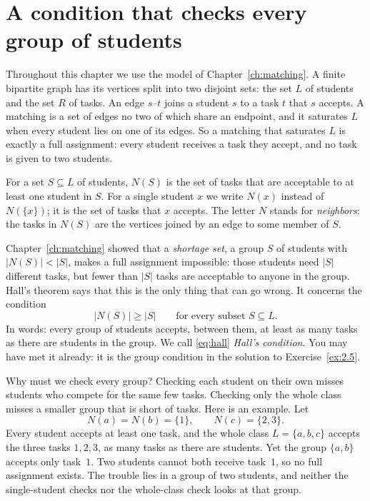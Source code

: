 \section{A condition that checks every group of students}\label{ch09:sec:condition}
Throughout this chapter we use the model of Chapter~\ref{ch:matching}. A finite bipartite graph has its vertices split into two disjoint sets: the set $L$ of students and the set $R$ of tasks. An edge $s$--$t$ joins a student $s$ to a task $t$ that $s$ accepts. A matching is a set of edges no two of which share an endpoint, and it saturates $L$ when every student lies on one of its edges. So a matching that saturates $L$ is exactly a full assignment: every student receives a task they accept, and no task is given to two students.

For a set $S\subseteq L$ of students, $N(S)$ is the set of tasks that are acceptable to at least one student in $S$. For a single student $x$ we write $N(x)$ instead of $N(\{x\})$; it is the set of tasks that $x$ accepts. The letter $N$ stands for \emph{neighbors}: the tasks in $N(S)$ are the vertices joined by an edge to some member of $S$.

Chapter~\ref{ch:matching} showed that a \emph{shortage set}, a group $S$ of students with $|N(S)|<|S|$, makes a full assignment impossible: those students need $|S|$ different tasks, but fewer than $|S|$ tasks are acceptable to anyone in the group. Hall's theorem says that this is the only thing that can go wrong. It concerns the condition
\[
|N(S)|\ge |S|\qquad\text{for every subset }S\subseteq L.
\tag{H}\label{eq:hall}
\]
In words: every group of students accepts, between them, at least as many tasks as there are students in the group. We call \eqref{eq:hall} \emph{Hall's condition}. You may have met it already: it is the group condition in the solution to Exercise~\ref{ex:2.5}.

Why must we check every group? Checking each student on their own misses students who compete for the same few tasks. Checking only the whole class misses a smaller group that is short of tasks. Here is an example. Let
\[
N(a)=N(b)=\{1\},\qquad N(c)=\{2,3\}.
\]
Every student accepts at least one task, and the whole class $L=\{a,b,c\}$ accepts the three tasks $1,2,3$, as many tasks as there are students. Yet the group $\{a,b\}$ accepts only task~$1$. Two students cannot both receive task~$1$, so no full assignment exists. The trouble lies in a group of two students, and neither the single-student checks nor the whole-class check looks at that group.

